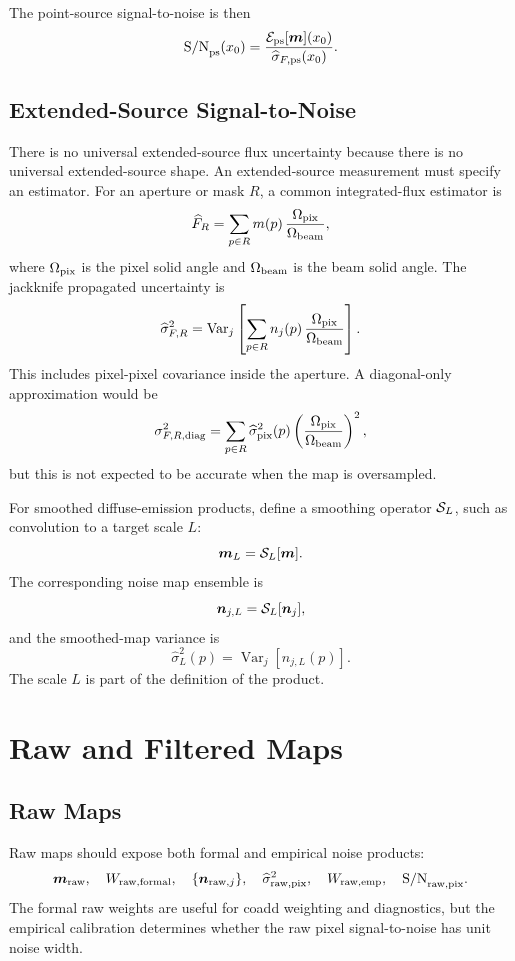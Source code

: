 \documentclass[11pt]{article}
\newcommand{\map}{\boldsymbol{m}}
\newcommand{\noise}{\boldsymbol{n}}
\newcommand{\var}{\operatorname{Var}}
\newcommand{\snr}{\mathrm{S/N}}
\begin{document}
The point-source signal-to-noise is then
\[
  \snr_{\rm ps}(x_0) =
    \frac{
      {\cal E}_{\rm ps}[\map](x_0)
    }{
      \widehat{\sigma}_{F,\rm ps}(x_0)
    }.
\]

\subsection{Extended-Source Signal-to-Noise}

There is no universal extended-source flux uncertainty because there is no
universal extended-source shape. An extended-source measurement must specify an
estimator. For an aperture or mask \(R\), a common integrated-flux estimator is
\[
  \widehat{F}_R =
    \sum_{p\in R}
    m(p)\,
    \frac{\Omega_{\rm pix}}{\Omega_{\rm beam}},
\]
where \(\Omega_{\rm pix}\) is the pixel solid angle and \(\Omega_{\rm beam}\)
is the beam solid angle. The jackknife propagated uncertainty is
\[
  \widehat{\sigma}_{F,R}^2 =
    \var_j
    \left[
      \sum_{p\in R}
      n_j(p)\,
      \frac{\Omega_{\rm pix}}{\Omega_{\rm beam}}
    \right].
\]
This includes pixel-pixel covariance inside the aperture. A diagonal-only
approximation would be
\[
  \sigma^2_{F,R,{\rm diag}} =
    \sum_{p\in R}
    \widehat{\sigma}^2_{\rm pix}(p)
    \left(
      \frac{\Omega_{\rm pix}}{\Omega_{\rm beam}}
    \right)^2,
\]
but this is not expected to be accurate when the map is oversampled.

For smoothed diffuse-emission products, define a smoothing operator
\({\cal S}_L\), such as convolution to a target scale \(L\):
\[
  \map_L = {\cal S}_L[\map].
\]
The corresponding noise map ensemble is
\[
  \noise_{j,L} = {\cal S}_L[\noise_j],
\]
and the smoothed-map variance is
\[
  \widehat{\sigma}^2_L(p) =
    \var_j \left[ n_{j,L}(p) \right].
\]
The scale \(L\) is part of the definition of the product.

\section{Raw and Filtered Maps}

\subsection{Raw Maps}

Raw maps should expose both formal and empirical noise products:
\[
  \map_{\rm raw},
  \quad
  W_{{\rm raw},{\rm formal}},
  \quad
  \{\noise_{{\rm raw},j}\},
  \quad
  \widehat{\sigma}^2_{{\rm raw},{\rm pix}},
  \quad
  W_{{\rm raw},{\rm emp}},
  \quad
  \snr_{{\rm raw},{\rm pix}}.
\]
The formal raw weights are useful for coadd weighting and diagnostics, but the
empirical calibration determines whether the raw pixel signal-to-noise has unit
noise width.
\end{document}
